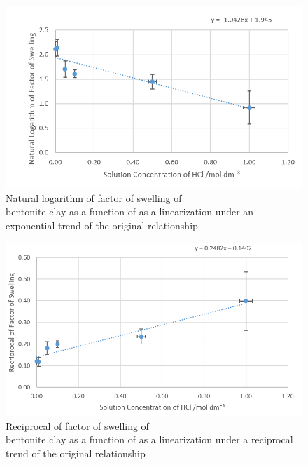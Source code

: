 \documentclass[11pt, letterpaper]{article}
\begin{document}
\begin{multicols}{2}
    \begin{figure}[H]
        \centering
        \includegraphics[width=\linewidth]{lnLinearization.png}
        \caption{Natural logarithm of factor of swelling of\\bentonite clay as a function of \ce{[HCl]} as a linearization under an exponential trend of the original relationship}
        \label{fig:lnLinearization}
    \end{figure}
    \begin{figure}[H]
        \centering
        \includegraphics[width=\linewidth]{reciprocalLinearization.png}
        \caption{Reciprocal of factor of swelling of\\bentonite clay as a function of \ce{[HCl]} as a linearization under a reciprocal trend of the original relationship}
        \label{fig:reciprocalLinearization}
    \end{figure}
\end{multicols}
\end{document}
